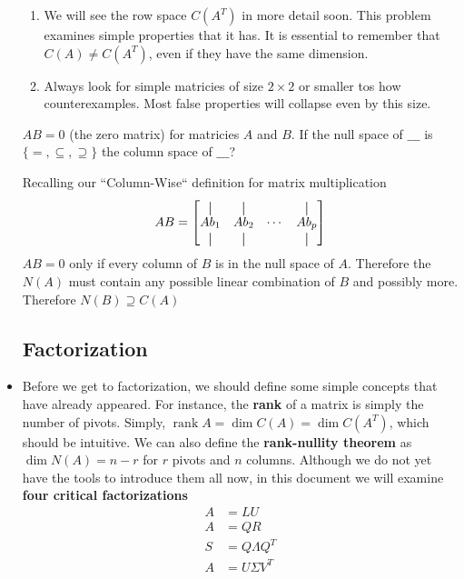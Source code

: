 \documentclass[11pt]{article}
\newcommand*{\vertbar}{\rule[-1ex]{0.5pt}{2.5ex}}
\begin{document}
\begin{itemize}
\begin{examplebox}[1.3]
\begin{solution}[1.3]
	\end{solution}
	\begin{takeaways}[1.3]\quad\vspace{-0.3cm}
		\begin{enumerate}
		    \item We will see the row space $C(A^{T})$ in more detail soon. This problem examines simple properties that it has. It is essential to remember that $C(A) \neq C(A^{T})$, even if they have the same dimension.
			\item Always look for simple matricies of size $2 \times 2$ or smaller tos how counterexamples. Most false properties will collapse even by this size.
		\end{enumerate}
	\end{takeaways}
    
\end{examplebox}

\begin{examplebox}[1.4]\quad
$AB = 0$ (the zero matrix) for matricies $A$ and $B$. If the null space of $\_\_\_$ is $\{=, \subseteq, \supseteq \}$ the column space of $\_\_\_$?
\begin{solution}[1.4]\quad\vspace{-0.3cm}
	Recalling our ``Column-Wise`` definition for matrix multiplication
			$$AB = \begin{bmatrix}   
			  \vertbar & \vertbar &  & \vertbar\\
			Ab_{1} & Ab_{2} & \cdots & Ab_{p}\\
			  \vertbar & \vertbar &  & \vertbar
			\end{bmatrix}$$
			$AB=0$ only if every column of $B$ is in the null space of $A$. Therefore the $N(A)$ must contain any possible linear combination of $B$ and possibly more. Therefore $N(B) \supseteq C(A)$
\end{solution} 
\end{examplebox}

\subsection{Factorization}
\item Before we get to factorization, we should define some simple concepts that have already appeared. For instance, the \textbf{rank} of a matrix is simply the number of pivots. Simply, $\operatorname{rank} A = \dim C(A) = \dim C(A^{T})$, which should be intuitive. We can also define the \textbf{rank-nullity theorem} as $\dim N(A) = n-r$ for $r$ pivots and $n$ columns. Although we do not yet have the tools to introduce them all now, in this document we will examine \textbf{four critical factorizations}
	\begin{align}
		A &= LU \\
		A &= QR \\
		S &= Q \Lambda Q^{T} \\
		A &= U \Sigma V^{T}
	\end{align}

\end{itemize}
\end{document}
